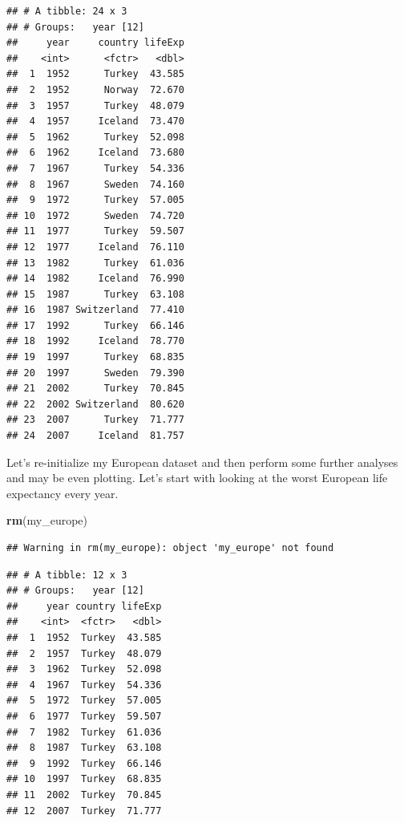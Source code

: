 \documentclass[]{article}
\newenvironment{Shaded}{\begin{snugshade}}{\end{snugshade}}
\newcommand{\KeywordTok}[1]{\textcolor[rgb]{0.13,0.29,0.53}{\textbf{{#1}}}}
\newcommand{\DataTypeTok}[1]{\textcolor[rgb]{0.13,0.29,0.53}{{#1}}}
\newcommand{\DecValTok}[1]{\textcolor[rgb]{0.00,0.00,0.81}{{#1}}}
\newcommand{\StringTok}[1]{\textcolor[rgb]{0.31,0.60,0.02}{{#1}}}
\newcommand{\NormalTok}[1]{{#1}}
\begin{document}
\begin{verbatim}
## # A tibble: 24 x 3
## # Groups:   year [12]
##     year     country lifeExp
##    <int>      <fctr>   <dbl>
##  1  1952      Turkey  43.585
##  2  1952      Norway  72.670
##  3  1957      Turkey  48.079
##  4  1957     Iceland  73.470
##  5  1962      Turkey  52.098
##  6  1962     Iceland  73.680
##  7  1967      Turkey  54.336
##  8  1967      Sweden  74.160
##  9  1972      Turkey  57.005
## 10  1972      Sweden  74.720
## 11  1977      Turkey  59.507
## 12  1977     Iceland  76.110
## 13  1982      Turkey  61.036
## 14  1982     Iceland  76.990
## 15  1987      Turkey  63.108
## 16  1987 Switzerland  77.410
## 17  1992      Turkey  66.146
## 18  1992     Iceland  78.770
## 19  1997      Turkey  68.835
## 20  1997      Sweden  79.390
## 21  2002      Turkey  70.845
## 22  2002 Switzerland  80.620
## 23  2007      Turkey  71.777
## 24  2007     Iceland  81.757
\end{verbatim}

Let's re-initialize my European dataset and then perform some further
analyses and may be even plotting. Let's start with looking at the worst
European life expectancy every year.

\begin{Shaded}
\begin{Highlighting}[]
\KeywordTok{rm}\NormalTok{(my_europe)}
\end{Highlighting}
\end{Shaded}

\begin{verbatim}
## Warning in rm(my_europe): object 'my_europe' not found
\end{verbatim}

\begin{Shaded}
\end{Shaded}

\begin{verbatim}
## # A tibble: 12 x 3
## # Groups:   year [12]
##     year country lifeExp
##    <int>  <fctr>   <dbl>
##  1  1952  Turkey  43.585
##  2  1957  Turkey  48.079
##  3  1962  Turkey  52.098
##  4  1967  Turkey  54.336
##  5  1972  Turkey  57.005
##  6  1977  Turkey  59.507
##  7  1982  Turkey  61.036
##  8  1987  Turkey  63.108
##  9  1992  Turkey  66.146
## 10  1997  Turkey  68.835
## 11  2002  Turkey  70.845
## 12  2007  Turkey  71.777
\end{verbatim}
\end{document}
